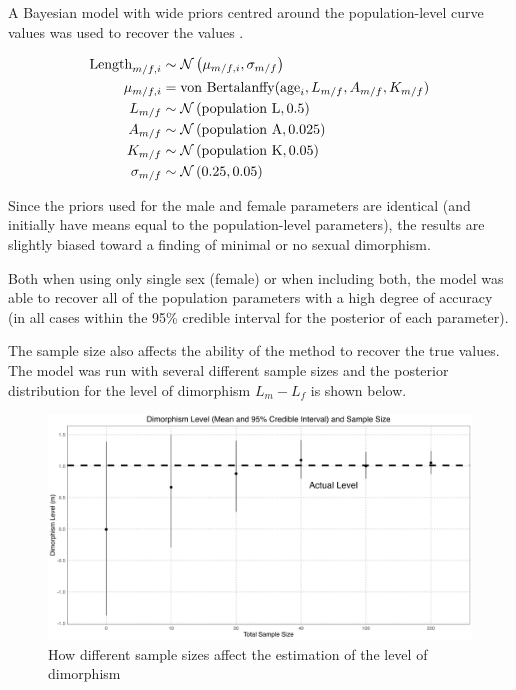 \documentclass[letterpaper]{article}
\begin{document}
 A Bayesian model with wide priors centred around the population-level curve values was used to recover the values \parencite{rCore, rstan}.

\begin{align*}
\text{Length}_{m/f,i} &\sim \mathcal{N}\left(\mu_{m/f, i}, \sigma_{m / f}\right) \\
\mu_{m/f, i} &= \text{von Bertalanffy}(\text{age}_i, L_{ m/f }, A_{ m/f }, K_{ m/f }) \\
L_{ m/f } &\sim \mathcal{N}\left(\text{population L}, 0.5\right) \\
A_{ m/f } &\sim \mathcal{N}\left(\text{population A}, 0.025\right) \\
K_{ m/f } &\sim \mathcal{N}\left(\text{population K}, 0.05\right) \\
\sigma_{m/f} &\sim \mathcal{N}\left(0.25, 0.05\right) \\
\end{align*}

Since the priors used for the male and female parameters are identical (and initially have means equal to the population-level parameters), the results are slightly biased toward a finding of minimal or no sexual dimorphism.

Both when using only single sex (female) or when including both, the model was able to recover all of the population parameters with a high degree of accuracy (in all cases within the 95\% credible interval for the posterior of each parameter).

The sample size also affects the ability of the method to recover the true values. The model was run with several different sample sizes and the posterior distribution for the level of dimorphism $L_m - L_f$ is shown below.

\begin{figure}[H]
	\centering
	\includegraphics[width = \textwidth]{images/alligatorSampleSize.png}
	\caption{How different sample sizes affect the estimation of the level of dimorphism}
	\label{fig:alligatorSampleSize}
\end{figure}
\end{document}
